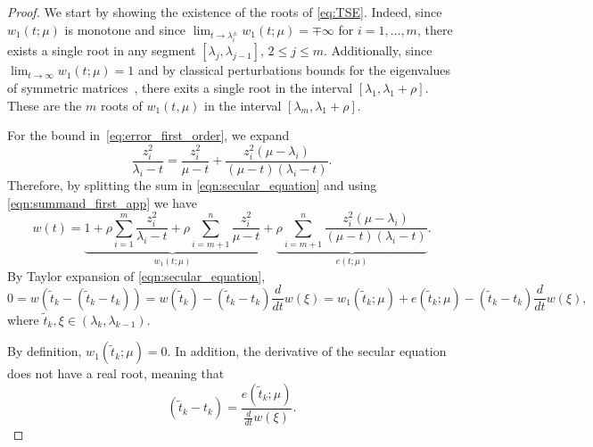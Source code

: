\documentclass[11pt]{article}
\begin{document}
\begin{proof}
We start by showing the existence of the roots of \eqref{eq:TSE}. Indeed, since $w_1(t ; \mu)$ is monotone and since $\lim_{t\to\lambda_i^{\pm}} w_1(t;\mu) = \mp\infty$ for $i=1,\ldots,m$, there exists a single root in any segment $[\lambda_j,\lambda_{j-1}]$, $2 \le j \le m$. Additionally, since $\lim_{t \rightarrow \infty}w_1(t ; \mu) = 1 $ and by classical perturbations bounds for the eigenvalues of symmetric matrices~\cite[Corollary 8.1.6]{golub2012matrix}, there exits a single root in the interval $[\lambda_1, \lambda_1 + \rho]$. These are the $m$ roots of $w_1(t, \mu)$ in the interval $[\lambda_m, \lambda_1 + \rho]$.

For the bound in~\eqref{eq:error_first_order}, we expand
\begin{equation} \label{eqn:summand_first_app}
  \frac{z_i^2}{\lambda_i - t} = \frac{z_i^2}{\mu-t} +  \frac{z_i^2(\mu - \lambda_i)}{(\mu-t)(\lambda_i - t)} .
\end{equation}
Therefore, by splitting the sum in \eqref{eqn:secular_equation} and using \eqref{eqn:summand_first_app} we have
\begin{equation} \label{eq:se_split}
w(t)  =  \underbrace{1 + \rho \sum_{i=1}^{m} {\frac{z_i^2}{\lambda_i - t}} + \rho \sum_{i=m+1}^{n}  {\frac{z_i^2}{\mu -t}}}_{w_{1}(t ; \mu)}  + \underbrace{\rho \sum_{i=m+1}^{n} \frac{z_i^2 (\mu - \lambda_i)}{(\mu - t)(\lambda_i-t)}}_{e(t;\mu)}  . 
\end{equation}
By Taylor expansion of \eqref{eqn:secular_equation},
\begin{equation}
0  = w(\widetilde{t}_k - (\widetilde{t}_k-t_k)) = w(\widetilde{t}_k) - (\widetilde{t}_k-t_k) \frac{d}{dt}w(\xi) =  w_{1}(\widetilde{t}_k ; \mu) + e(\widetilde{t}_k ; \mu ) - (\widetilde{t}_k-t_k) \frac{d}{dt}w(\xi) ,
\end{equation}
where $\widetilde{t}_k, \xi \in (\lambda_{k},\lambda_{k-1})$.

By definition, $w_{1}(\widetilde{t}_k ; \mu)=0$. In addition, the derivative of the secular equation does not have a real root, meaning that   
\begin{equation} \label{eqn:bnd_roots_differ}
    (\widetilde{t}_k-t_k) = \frac{e(\widetilde{t}_k;\mu)}{ \frac{d}{dt}w(\xi)} .   
\end{equation}


\end{proof}
\end{document}
